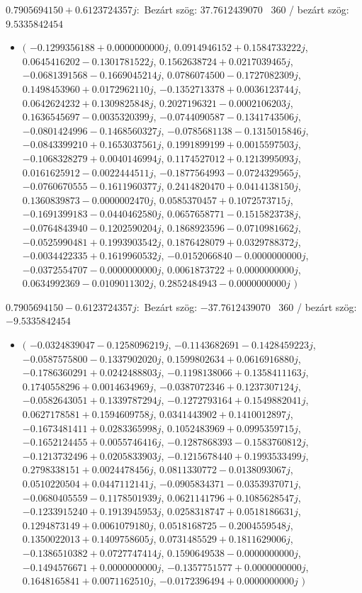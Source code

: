 \documentclass[14pt,a4paper]{article}
\begin{document}
$0.7905694150+0.6123724357j$:\
Bezárt szög: $37.7612439070$ \
360 / bezárt szög: $9.5335842454$\
\begin{itemize}
\item
$\big($
$-0.1299356188+0.0000000000j$, $0.0914946152+0.1584733222j$, $0.0645416202-0.1301781522j$, $0.1562638724+0.0217039465j$, $-0.0681391568-0.1669045214j$, $0.0786074500-0.1727082309j$, $0.1498453960+0.0172962110j$, $-0.1352713378+0.0036123744j$, $0.0642624232+0.1309825848j$, $0.2027196321-0.0002106203j$, $0.1636545697-0.0035320399j$, $-0.0744090587-0.1341743506j$, $-0.0801424996-0.1468560327j$, $-0.0785681138-0.1315015846j$, $-0.0843399210+0.1653037561j$, $0.1991899199+0.0015597503j$, $-0.1068328279+0.0040146994j$, $0.1174527012+0.1213995093j$, $0.0161625912-0.0022444511j$, $-0.1877564993-0.0724329565j$, $-0.0760670555-0.1611960377j$, $0.2414820470+0.0414138150j$, $0.1360839873-0.0000002470j$, $0.0585370457+0.1072573715j$, $-0.1691399183-0.0440462580j$, $0.0657658771-0.1515823738j$, $-0.0764843940-0.1202590204j$, $0.1868923596-0.0710981662j$, $-0.0525990481+0.1993903542j$, $0.1876428079+0.0329788372j$, $-0.0034422335+0.1619960532j$, $-0.0152066840-0.0000000000j$, $-0.0372554707-0.0000000000j$, $0.0061873722+0.0000000000j$, $0.0634992369-0.0109011302j$, $0.2852484943-0.0000000000j$
$\big)$
\end{itemize}
$0.7905694150-0.6123724357j$:\
Bezárt szög: $-37.7612439070$ \
360 / bezárt szög: $-9.5335842454$\
\begin{itemize}
\item
$\big($
$-0.0324839047-0.1258096219j$, $-0.1143682691-0.1428459223j$, $-0.0587575800-0.1337902020j$, $0.1599802634+0.0616916880j$, $-0.1786360291+0.0242488803j$, $-0.1198138066+0.1358411163j$, $0.1740558296+0.0014634969j$, $-0.0387072346+0.1237307124j$, $-0.0582643051+0.1339787294j$, $-0.1272793164+0.1549882041j$, $0.0627178581+0.1594609758j$, $0.0341443902+0.1410012897j$, $-0.1673481411+0.0283365998j$, $0.1052483969+0.0995359715j$, $-0.1652124455+0.0055746416j$, $-0.1287868393-0.1583760812j$, $-0.1213732496+0.0205833903j$, $-0.1215678440+0.1993533499j$, $0.2798338151+0.0024478456j$, $0.0811330772-0.0138093067j$, $0.0510220504+0.0447112141j$, $-0.0905834371-0.0353937071j$, $-0.0680405559-0.1178501939j$, $0.0621141796+0.1085628547j$, $-0.1233915240+0.1913945953j$, $0.0258318747+0.0518186631j$, $0.1294873149+0.0061079180j$, $0.0518168725-0.2004559548j$, $0.1350022013+0.1409758605j$, $0.0731485529+0.1811629006j$, $-0.1386510382+0.0727747414j$, $0.1590649538-0.0000000000j$, $-0.1494576671+0.0000000000j$, $-0.1357751577+0.0000000000j$, $0.1648165841+0.0071162510j$, $-0.0172396494+0.0000000000j$
$\big)$
\end{itemize}
\end{document}
